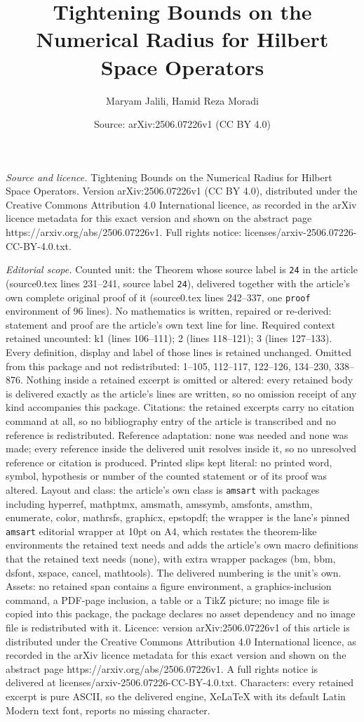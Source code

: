 \documentclass[10pt,a4paper]{amsart}
\title[Tightening Bounds on the Numerical Radius for Hilbert Space ]{Tightening Bounds on the Numerical Radius for Hilbert Space Operators}
\author{Maryam Jalili, Hamid Reza Moradi}
\date{Source: arXiv:2506.07226v1 (CC BY 4.0)}
\begin{document}
\maketitle

\noindent\emph{Source and licence.} Tightening Bounds on the Numerical Radius for Hilbert Space Operators. Version arXiv:2506.07226v1 (CC BY 4.0), distributed under the Creative Commons Attribution 4.0 International licence, as recorded in the arXiv licence metadata for this exact version and shown on the abstract page https://arxiv.org/abs/2506.07226v1. Full rights notice: licenses/arxiv-2506.07226-CC-BY-4.0.txt.\par\smallskip

\noindent\textit{Editorial scope.} Counted unit: the Theorem whose source label is \texttt{24} in the article (source0.tex lines 231--241, source label \texttt{24}), delivered together with the article's own complete original proof of it (source0.tex lines 242--337, one \texttt{proof} environment of 96 lines). No mathematics is written, repaired or re-derived: statement and proof are the article's own text line for line. Required context retained uncounted: k1 (lines 106--111); 2 (lines 118--121); 3 (lines 127--133). Every definition, display and label of those lines is retained unchanged. Omitted from this package and not redistributed: 1--105, 112--117, 122--126, 134--230, 338--876. Nothing inside a retained excerpt is omitted or altered: every retained body is delivered exactly as the article's lines are written, so no omission receipt of any kind accompanies this package. Citations: the retained excerpts carry no citation command at all, so no bibliography entry of the article is transcribed and no reference is redistributed. Reference adaptation: none was needed and none was made; every reference inside the delivered unit resolves inside it, so no unresolved reference or citation is produced. Printed slips kept literal: no printed word, symbol, hypothesis or number of the counted statement or of its proof was altered. Layout and class: the article's own class is \texttt{amsart} with packages including hyperref, mathptmx, amsmath, amssymb, amsfonts, amsthm, enumerate, color, mathrsfs, graphicx, epstopdf; the wrapper is the lane's pinned \texttt{amsart} editorial wrapper at 10pt on A4, which restates the theorem-like environments the retained text needs and adds the article's own macro definitions that the retained text needs (none), with extra wrapper packages (bm, bbm, dsfont, xspace, cancel, mathtools). The delivered numbering is the unit's own. Assets: no retained span contains a figure environment, a graphics-inclusion command, a PDF-page inclusion, a table or a TikZ picture; no image file is copied into this package, the package declares no asset dependency and no image file is redistributed with it. Licence: version arXiv:2506.07226v1 of this article is distributed under the Creative Commons Attribution 4.0 International licence, as recorded in the arXiv licence metadata for this exact version and shown on the abstract page https://arxiv.org/abs/2506.07226v1. A full rights notice is delivered at licenses/arxiv-2506.07226-CC-BY-4.0.txt. Characters: every retained excerpt is pure ASCII, so the delivered engine, XeLaTeX with its default Latin Modern text font, reports no missing character.
\end{document}
